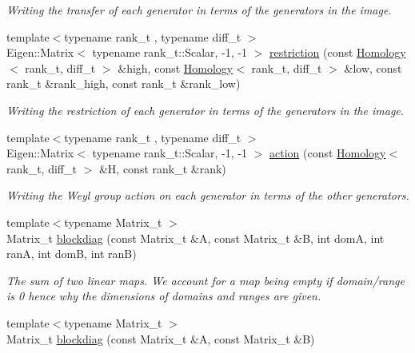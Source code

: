 \begin{DoxyCompactItemize}
\begin{DoxyCompactList}\small\item\em Writing the transfer of each generator in terms of the generators in the image. \end{DoxyCompactList}\item 
{\footnotesize template$<$typename rank\+\_\+t , typename diff\+\_\+t $>$ }\\Eigen\+::\+Matrix$<$ typename rank\+\_\+t\+::\+Scalar, -\/1, -\/1 $>$ \hyperlink{namespaceMackey_a256b1e73e413a924ce2bf0e86551a928}{restriction} (const \hyperlink{classMackey_1_1Homology}{Homology}$<$ rank\+\_\+t, diff\+\_\+t $>$ \&high, const \hyperlink{classMackey_1_1Homology}{Homology}$<$ rank\+\_\+t, diff\+\_\+t $>$ \&low, const rank\+\_\+t \&rank\+\_\+high, const rank\+\_\+t \&rank\+\_\+low)
\begin{DoxyCompactList}\small\item\em Writing the restriction of each generator in terms of the generators in the image. \end{DoxyCompactList}\item 
{\footnotesize template$<$typename rank\+\_\+t , typename diff\+\_\+t $>$ }\\Eigen\+::\+Matrix$<$ typename rank\+\_\+t\+::\+Scalar, -\/1, -\/1 $>$ \hyperlink{namespaceMackey_a2169692139cf46ac28719780e2a7f867}{action} (const \hyperlink{classMackey_1_1Homology}{Homology}$<$ rank\+\_\+t, diff\+\_\+t $>$ \&H, const rank\+\_\+t \&rank)
\begin{DoxyCompactList}\small\item\em Writing the Weyl group action on each generator in terms of the other generators. \end{DoxyCompactList}\item 
{\footnotesize template$<$typename Matrix\+\_\+t $>$ }\\Matrix\+\_\+t \hyperlink{namespaceMackey_a6d2d912037da84c6884ac62db997cc0f}{blockdiag} (const Matrix\+\_\+t \&A, const Matrix\+\_\+t \&B, int domA, int ranA, int domB, int ranB)
\begin{DoxyCompactList}\small\item\em The sum of two linear maps. We account for a map being empty if domain/range is 0 hence why the dimensions of domains and ranges are given. \end{DoxyCompactList}\item 
{\footnotesize template$<$typename Matrix\+\_\+t $>$ }\\Matrix\+\_\+t \hyperlink{namespaceMackey_a64d299f4b6f36e4b4e873b56a44b14b0}{blockdiag} (const Matrix\+\_\+t \&A, const Matrix\+\_\+t \&B)

\end{DoxyCompactItemize}

